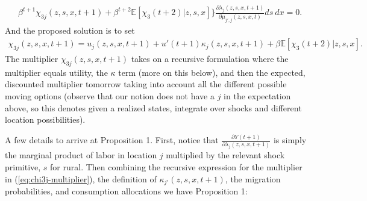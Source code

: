 \documentclass[12pt,pdftex]{article}
\begin{document}
\begin{onehalfspacing}
{\begin{align}
\nonumber \\
&\beta^{t+1}\chi_{3j}(z,s,x, t+1) + \beta^{t+2}\mathbb{E}\left[\chi_{3}(t+2) | z,s,x \right] \bigg \} \frac{\partial \lambda_{j}(z,s,x,t+1)}{\partial \mu_{j',j}(z,s,x,t)} ds \ dx = 0.
\end{align}}
And the proposed solution is to set
\begin{align}
\chi_{3j}(z, s, x, t+1) =  u_{j}(z,s,x,t+1) +  u'(t+1) \kappa_j(z,s,x,t+1) + \beta \mathbb{E}\left[\chi_{3}(t+2) |z, s, x \right].
\label{eq:chi3j-multiplier}
\end{align}
The multiplier $\chi_{3j}(z, s, x, t+1)$ takes on a recursive formulation where the multiplier equals utility, the $\kappa$ term (more on this below), and then the expected, discounted multiplier tomorrow taking into account all the different possible moving options (observe that our notion does not have a $j$ in the expectation above, so this denotes given a realized states, integrate over shocks and different location possibilities).  


A few details to arrive at Proposition 1.  First, notice that $\frac{\partial Y(t+1)}{\partial \lambda_{j}(z, s, x, t+1)} $ is simply the marginal product of labor in location $j$ multiplied by the relevant shock primitive, $s$ for rural. Then combining the recursive expression for the multiplier in (\ref{eq:chi3j-multiplier}), the definition of $\kappa_{j'}(z, s,x,t+1)$,  the migration probabilities, and consumption allocations we have Proposition 1:


\end{onehalfspacing}
\end{document}
